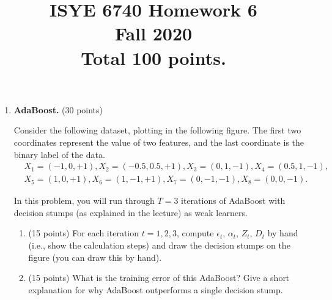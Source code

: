 \documentclass[twoside,10pt]{article}
\begin{document}
\title{ISYE 6740 Homework 6\\ 
Fall 2020\\
\small Total 100 points.}
\date{}
\maketitle







\begin{enumerate}


\item  {\bf AdaBoost.} (30 points)

Consider the following dataset, plotting in the following figure. The first two coordinates represent the value of two features, and the last coordinate is the binary label of the data.
\begin{equation*}
\begin{split}
&X_1 = (-1, 0, +1), X_2 = (-0.5, 0.5, +1), X_3 = (0, 1, -1), X_4 = (0.5, 1, -1), \\
&X_5 = (1, 0, +1), X_6 = (1, -1, +1), X_7 = (0, -1, -1), X_8 = (0, 0, -1).
\end{split}
\end{equation*}

In this problem, you will run through $T = 3$ iterations of AdaBoost with decision stumps (as explained in the lecture) as weak learners.

\begin{enumerate}
\item (15 points) For each iteration $t = 1, 2, 3$, compute $\epsilon_t$, $\alpha_t$, $Z_t$, $D_t$ by hand (i.e., show the calculation steps) and draw the decision stumps on the figure (you can draw this by hand). 

\item (15 points) What is the training error of this AdaBoost? Give a short explanation for why AdaBoost outperforms a single decision stump.

\end{enumerate}



\end{enumerate}
\end{document}
